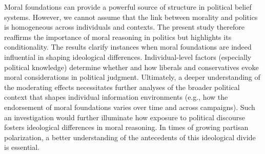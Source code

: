 \documentclass[12pt]{article}
\begin{document}
Moral foundations can provide a powerful source of structure in political belief systems. However, we cannot assume that the link between morality and politics is homogeneous across individuals and contexts. The present study therefore reaffirms the importance of moral reasoning in politics but highlights its conditionality. The results clarify instances when moral foundations are indeed influential in shaping ideological differences. Individual-level factors (especially political knowledge) determine whether and how liberals and conservatives evoke moral considerations in political judgment. Ultimately, a deeper understanding of the moderating effects necessitates further analyses of the broader political context that shapes individual information environments (e.g., how the endorsement of moral foundations varies over time and across campaigns). Such an investigation would further illuminate how exposure to political discourse fosters ideological differences in moral reasoning. In times of growing partisan polarization, a better understanding of the antecedents of this ideological divide is essential.

\clearpage\normalsize\singlespacing


\end{document}
